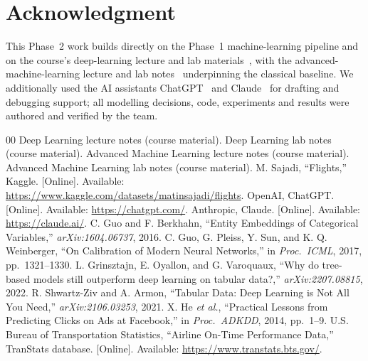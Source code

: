 \documentclass[conference]{IEEEtran}
\begin{document}
\section*{Acknowledgment}
This Phase~2 work builds directly on the Phase~1 machine-learning pipeline and on
the course's deep-learning lecture and lab materials~\cite{dl-notes,dl-lab}, with
the advanced-machine-learning lecture and lab notes~\cite{aml-notes,aml-lab}
underpinning the classical baseline. We additionally used the AI assistants
ChatGPT~\cite{chatgpt} and Claude~\cite{claude} for drafting and debugging
support; all modelling decisions, code, experiments and results were authored and
verified by the team.

\begin{thebibliography}{00}
 Deep Learning lecture notes (course material).
 Deep Learning lab notes (course material).
 Advanced Machine Learning lecture notes (course material).
 Advanced Machine Learning lab notes (course material).
 M. Sajadi, ``Flights,'' Kaggle. [Online]. Available: \url{https://www.kaggle.com/datasets/matinsajadi/flights}.
 OpenAI, ChatGPT. [Online]. Available: \url{https://chatgpt.com/}.
 Anthropic, Claude. [Online]. Available: \url{https://claude.ai/}.
 C. Guo and F. Berkhahn, ``Entity Embeddings of Categorical Variables,'' \emph{arXiv:1604.06737}, 2016.
 C. Guo, G. Pleiss, Y. Sun, and K. Q. Weinberger, ``On Calibration of Modern Neural Networks,'' in \emph{Proc.\ ICML}, 2017, pp.\ 1321--1330.
 L. Grinsztajn, E. Oyallon, and G. Varoquaux, ``Why do tree-based models still outperform deep learning on tabular data?,'' \emph{arXiv:2207.08815}, 2022.
 R. Shwartz-Ziv and A. Armon, ``Tabular Data: Deep Learning is Not All You Need,'' \emph{arXiv:2106.03253}, 2021.
 X. He \emph{et al.}, ``Practical Lessons from Predicting Clicks on Ads at Facebook,'' in \emph{Proc.\ ADKDD}, 2014, pp.\ 1--9.
 U.S. Bureau of Transportation Statistics, ``Airline On-Time Performance Data,'' TranStats database. [Online]. Available: \url{https://www.transtats.bts.gov/}.
\end{thebibliography}
\end{document}
